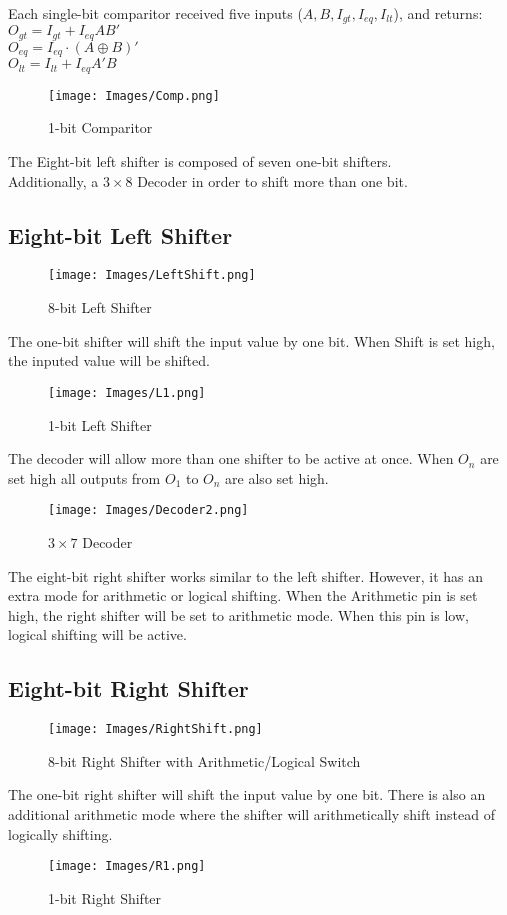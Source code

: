 \clearpage
\noindent
Each single-bit comparitor received five inputs ($A,B,I_{gt},I_{eq},I_{lt}$), and returns:\\
$O_{gt}=I_{gt}+I_{eq}AB'$\\
$O_{eq}=I_{eq}\cdot(A\oplus B)'$\\
$O_{lt}=I_{lt}+I_{eq}A'B$
\begin{figure}[!ht]
    \centering
    \texttt{[image: Images/Comp.png]}
    \caption{1-bit Comparitor}
\end{figure}

\clearpage
\noindent
The Eight-bit left shifter is composed of seven one-bit shifters.\\
Additionally, a $3\times8$ Decoder in order to shift more than one bit.
\subsection*{Eight-bit Left Shifter}
\begin{figure}[!ht]
    \centering
    \texttt{[image: Images/LeftShift.png]}
    \caption{8-bit Left Shifter}
\end{figure}

\clearpage
\noindent
The one-bit shifter will shift the input value by one bit. When Shift is set high, the inputed value will be shifted.
\begin{figure}[!ht]
    \centering
    \texttt{[image: Images/L1.png]}
    \caption{1-bit Left Shifter}
\end{figure}

\noindent
The decoder will allow more than one shifter to be active at once. When $O_n$ are set high all outputs from $O_1$ to $O_n$ are also set high.
\begin{figure}[!ht]
    \centering
    \texttt{[image: Images/Decoder2.png]}
    \caption{$3\times7$ Decoder}
\end{figure}

\clearpage
\noindent
The eight-bit right shifter works similar to the left shifter. However, it has an extra mode for arithmetic or logical shifting. When the Arithmetic pin is set high, the right shifter will be set to arithmetic mode. When this pin is low, logical shifting will be active.
\subsection*{Eight-bit Right Shifter}
\begin{figure}[!ht]
    \centering
    \texttt{[image: Images/RightShift.png]}
    \caption{8-bit Right Shifter with Arithmetic/Logical Switch}
\end{figure}

\clearpage
\noindent
The one-bit right shifter will shift the input value by one bit. There is also an additional arithmetic mode where the shifter will arithmetically shift instead of logically shifting.
\begin{figure}[!ht]
    \centering
    \texttt{[image: Images/R1.png]}
    \caption{1-bit Right Shifter}
\end{figure}